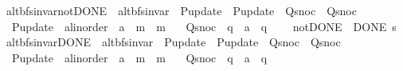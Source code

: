 \begin{isabellebody}
\ alt{\isacharunderscore}{\kern0pt}bfs{\isacharunderscore}{\kern0pt}invar{\isacharunderscore}{\kern0pt}not{\isacharunderscore}{\kern0pt}DONE\ {\isacharequal}{\kern0pt}\ alt{\isacharunderscore}{\kern0pt}bfs{\isacharunderscore}{\kern0pt}invar\ \ P{\isacharunderscore}{\kern0pt}update\ {\isacharequal}{\kern0pt}\ P{\isacharunderscore}{\kern0pt}update\ \ Q{\isacharunderscore}{\kern0pt}snoc\ {\isacharequal}{\kern0pt}\ Q{\isacharunderscore}{\kern0pt}snoc\ \isanewline
\ \ P{\isacharunderscore}{\kern0pt}update\ {\isacharcolon}{\kern0pt}{\isacharcolon}{\kern0pt}\ {\isachardoublequoteopen}{\isacharprime}{\kern0pt}a{\isacharcolon}{\kern0pt}{\isacharcolon}{\kern0pt}linorder\ {\isasymRightarrow}\ {\isacharprime}{\kern0pt}a\ {\isasymRightarrow}\ {\isacharprime}{\kern0pt}m\ {\isasymRightarrow}\ {\isacharprime}{\kern0pt}m{\isachardoublequoteclose}\ \isanewline
\ \ Q{\isacharunderscore}{\kern0pt}snoc\ {\isacharcolon}{\kern0pt}{\isacharcolon}{\kern0pt}\ {\isachardoublequoteopen}{\isacharprime}{\kern0pt}q\ {\isasymRightarrow}\ {\isacharprime}{\kern0pt}a\ {\isasymRightarrow}\ {\isacharprime}{\kern0pt}q{\isachardoublequoteclose}\ {\isacharplus}{\kern0pt}\isanewline
\ \ \ not{\isacharunderscore}{\kern0pt}DONE{\isacharcolon}{\kern0pt}\ {\isachardoublequoteopen}{\isasymnot}\ DONE\ s{\isachardoublequoteclose}\isanewline
\isanewline
{}\isamarkupfalse%
\ alt{\isacharunderscore}{\kern0pt}bfs{\isacharunderscore}{\kern0pt}invar{\isacharunderscore}{\kern0pt}DONE\ {\isacharequal}{\kern0pt}\ alt{\isacharunderscore}{\kern0pt}bfs{\isacharunderscore}{\kern0pt}invar\ \ P{\isacharunderscore}{\kern0pt}update\ {\isacharequal}{\kern0pt}\ P{\isacharunderscore}{\kern0pt}update\ \ Q{\isacharunderscore}{\kern0pt}snoc\ {\isacharequal}{\kern0pt}\ Q{\isacharunderscore}{\kern0pt}snoc\ \isanewline
\ \ P{\isacharunderscore}{\kern0pt}update\ {\isacharcolon}{\kern0pt}{\isacharcolon}{\kern0pt}\ {\isachardoublequoteopen}{\isacharprime}{\kern0pt}a{\isacharcolon}{\kern0pt}{\isacharcolon}{\kern0pt}linorder\ {\isasymRightarrow}\ {\isacharprime}{\kern0pt}a\ {\isasymRightarrow}\ {\isacharprime}{\kern0pt}m\ {\isasymRightarrow}\ {\isacharprime}{\kern0pt}m{\isachardoublequoteclose}\ \isanewline
\ \ Q{\isacharunderscore}{\kern0pt}snoc\ {\isacharcolon}{\kern0pt}{\isacharcolon}{\kern0pt}\ {\isachardoublequoteopen}{\isacharprime}{\kern0pt}q\ {\isasymRightarrow}\ {\isacharprime}{\kern0pt}a\ {\isasymRightarrow}\ {\isacharprime}{\kern0pt}q{\isachardoublequoteclose}\ {\isacharplus}{\kern0pt}\isanewline

\end{isabellebody}
